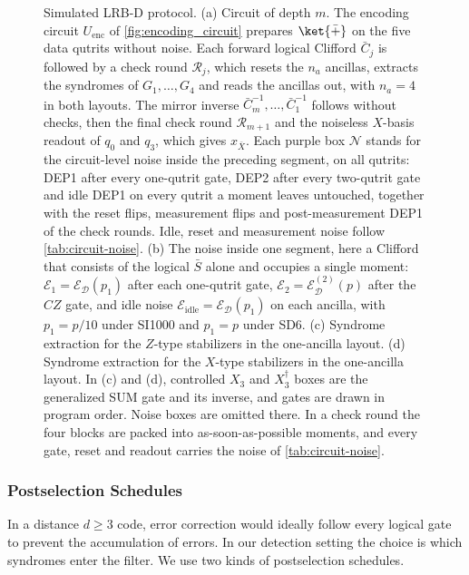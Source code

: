 \begin{figure}[H]
    \caption{Simulated LRB-D protocol. (a) Circuit of depth $m$. The encoding circuit $U_{\mathrm{enc}}$ of \autoref{fig:encoding_circuit} prepares $\ket{\bar +}$ on the five data qutrits without noise. Each forward logical Clifford $\bar C_j$ is followed by a check round $\mathcal{R}_j$, which resets the $n_a$ ancillas, extracts the syndromes of $G_1, \dots, G_4$ and reads the ancillas out, with $n_a = 4$ in both layouts. The mirror inverse $\bar C_m^{-1}, \dots, \bar C_1^{-1}$ follows without checks, then the final check round $\mathcal{R}_{m+1}$ and the noiseless $X$-basis readout of $q_0$ and $q_3$, which gives $x_{\bar X}$. Each purple box $\mathcal{N}$ stands for the circuit-level noise inside the preceding segment, on all qutrits: DEP1 after every one-qutrit gate, DEP2 after every two-qutrit gate and idle DEP1 on every qutrit a moment leaves untouched, together with the reset flips, measurement flips and post-measurement DEP1 of the check rounds. Idle, reset and measurement noise follow \autoref{tab:circuit-noise}. (b) The noise inside one segment, here a Clifford that consists of the logical $\bar S$ alone and occupies a single moment: $\mathcal{E}_1 = \mathcal{E}_{\mathcal{D}}(p_1)$ after each one-qutrit gate, $\mathcal{E}_2 = \mathcal{E}^{(2)}_{\mathcal{D}}(p)$ after the $CZ$ gate, and idle noise $\mathcal{E}_{\mathrm{idle}} = \mathcal{E}_{\mathcal{D}}(p_1)$ on each ancilla, with $p_1 = p/10$ under SI1000 and $p_1 = p$ under SD6. (c) Syndrome extraction for the $Z$-type stabilizers in the one-ancilla layout. (d) Syndrome extraction for the $X$-type stabilizers in the one-ancilla layout. In (c) and (d), controlled $X_3$ and $X_3^{\dagger}$ boxes are the generalized SUM gate and its inverse, and gates are drawn in program order. Noise boxes are omitted there. In a check round the four blocks are packed into as-soon-as-possible moments, and every gate, reset and readout carries the noise of \autoref{tab:circuit-noise}.}
    \label{fig:lrb_d_full}
\end{figure}

\subsubsection{Postselection Schedules}
\label{subsub:postselection}
In a distance $d \ge 3$ code, error correction would ideally follow every logical gate to prevent the accumulation of errors. In our detection setting the choice is which syndromes enter the filter. We use two kinds of postselection schedules.

